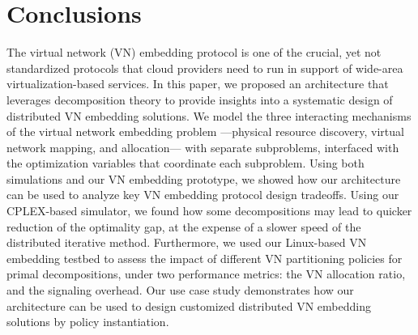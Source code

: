 \documentclass[a4paper, 10pt, conference]{ieeeconf}
\begin{document}
\vspace{-2mm}
\section{Conclusions}
\vspace{-1mm}


The virtual network (VN) embedding protocol is one of the crucial, yet not standardized protocols that cloud providers need to run in support of wide-area virtualization-based services.
In this paper, we proposed an architecture that leverages decomposition theory to provide insights into a systematic design of distributed VN embedding solutions. 
We model the three interacting mechanisms of the virtual network embedding problem ---physical resource discovery, virtual network mapping, and allocation--- with separate subproblems, interfaced with the optimization variables that coordinate each subproblem. 
Using both simulations and our VN embedding prototype, we showed how our architecture can be used to analyze key VN embedding protocol design tradeoffs. Using our CPLEX-based simulator, we found how some decompositions may lead to quicker reduction of the optimality gap, at the expense of a slower speed of the distributed iterative method. Furthermore, we used our Linux-based VN embedding testbed to assess the impact of different VN partitioning policies for primal decompositions, under two performance metrics: the VN allocation ratio, and the signaling overhead. Our use case study demonstrates how our architecture can be used to design customized distributed VN embedding solutions by policy instantiation. 









\end{document}

